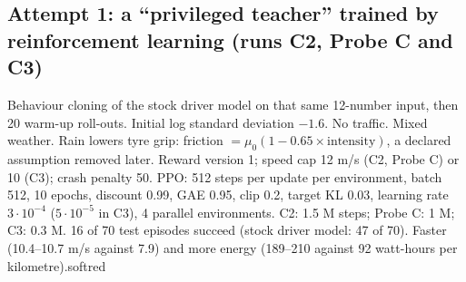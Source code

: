 \subsection{Attempt 1: a ``privileged teacher'' trained by reinforcement learning (runs C2, Probe C and C3)}
{Behaviour cloning of the stock driver model on that same 12-number input, then 20 warm-up roll-outs. Initial log standard deviation $-1.6$.}
{No traffic. Mixed weather. Rain lowers tyre grip: friction $=\mu_0(1-0.65\times\text{intensity})$, a declared assumption removed later. Reward version 1; speed cap 12 m/s (C2, Probe C) or 10 (C3); crash penalty 50.}
{PPO: 512 steps per update per environment, batch 512, 10 epochs, discount 0.99, GAE 0.95, clip 0.2, target KL 0.03, learning rate $3\cdot10^{-4}$ ($5\cdot10^{-5}$ in C3), 4 parallel environments. C2: 1.5 M steps; Probe C: 1 M; C3: 0.3 M.}
{16 of 70 test episodes succeed (stock driver model: 47 of 70). Faster (10.4--10.7 m/s against 7.9) and more energy (189--210 against 92 watt-hours per kilometre).}{softred}

